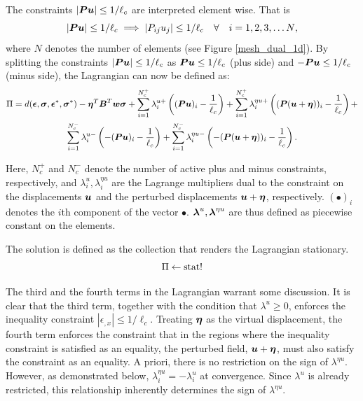 \documentclass[10pt]{cas-sc}
\begin{document}
The constraints $|\mbox{\boldmath $P$} \mbox{\boldmath $u$}|  \leq 1/{\ell_c}$ are interpreted element wise. That is
\begin{equation}
	|\mbox{\boldmath $P$} \mbox{\boldmath $u$}|  \leq 1/{\ell_c} \implies |P_{ij}u_j|  \leq 1/{\ell_c} \quad \forall \quad i={1,2,3,\dots N},
\end{equation}
where  $N$ denotes the number of  elements (see Figure \ref{mesh_dual_1d}).  By splitting the constraints $|\mbox{\boldmath $P$} \mbox{\boldmath $u$}|  \leq 1/{\ell_c}$ as $\mbox{\boldmath $P$} \mbox{\boldmath $u$}  \leq 1/{\ell_c}$ (plus side) and $-\mbox{\boldmath $P$} \mbox{\boldmath $u$}  \leq 1/{\ell_c}$ (minus side), the Lagrangian can now be defined as:
\begin{multline}
	\Pi = d(\mbox{\boldmath $\epsilon$},\mbox{\boldmath $\sigma$},\mbox{\boldmath $\epsilon$}^*,\mbox{\boldmath $\sigma$}^*) - \mbox{\boldmath $\eta$}^T \mbox{\boldmath $B$} ^T \mbox{\boldmath $w$}\mbox{\boldmath $\sigma$} + \sum_{i=1}^{N_c^+} \lambda^{u+}_i \left( (\mbox{\boldmath $P$} \mbox{\boldmath $u$})_i - \frac{1}{\ell_c}   \right) + \sum_{i=1}^{N_c^+} \lambda^{\eta u +}_i \left( (\mbox{\boldmath $P$} (\mbox{\boldmath $u$} + \mbox{\boldmath $\eta$}))_i - \frac{1}{\ell_c}   \right) + \\
	\sum_{i=1}^{N_c^-} \lambda^{u-}_i \left( -(\mbox{\boldmath $P$} \mbox{\boldmath $u$})_i - \frac{1}{\ell_c}   \right) + \sum_{i=1}^{N_c^-} \lambda^{\eta u-}_i \left( -(\mbox{\boldmath $P$} (\mbox{\boldmath $u$} + \mbox{\boldmath $\eta$}))_i - \frac{1}{\ell_c}   \right) \label{big_1D_lagrangian}.
\end{multline}

Here, $N_c^+$ and $N_c^-$ denote the number of active plus and minus constraints, respectively, and $\lambda^u_i, \lambda^{\eta u}_i$ are the Lagrange multipliers dual to the constraint on the displacements $\mbox{\boldmath $u$}$ and the perturbed displacements $\mbox{\boldmath $u$} + \mbox{\boldmath $\eta$}$, respectively. $(\bullet)_i$ denotes the $i$th component of the vector $\bullet$. $\mbox{\boldmath $\lambda$}^u, \mbox{\boldmath $\lambda$}^{\eta u}$ are thus defined as piecewise constant on the  elements.

The solution is defined as the collection that renders the Lagrangian stationary.
\begin{equation}
	\Pi  \leftarrow \operatorname{stat}!
\end{equation}

The third and the fourth terms in the Lagrangian warrant some discussion. It is clear that the third term, together with the condition that $\lambda^u \geq 0$, enforces the inequality constraint $|\epsilon_{,x}| \leq 1/\ell_c$. Treating $\mbox{\boldmath $\eta$}$ as the virtual displacement, the fourth term enforces the constraint that in the regions where the inequality constraint is satisfied as an equality, the perturbed field, $\mbox{\boldmath $u$}+\mbox{\boldmath $\eta$}$, must also satisfy the constraint as an equality. A priori, there is no restriction on the sign of $\lambda^{\eta u}$. However, as demonstrated below, $\lambda^{\eta u}_i = -\lambda^{ u}_i$ at convergence. Since $\lambda^u$ is already restricted, this relationship inherently determines the sign of $\lambda^{\eta u}$. 
\end{document}
